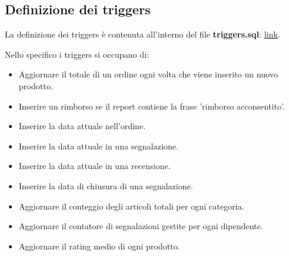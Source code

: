 \subsection{Definizione dei triggers}

La definizione dei triggers è contenuta all'interno del file \textbf{triggers.sql}: \href{https://github.com/krosspile/ecommerce_database/blob/master/src/database/triggers.sql}{link}.

Nello specifico i triggers si occupano di:\\
\begin{itemize}
    \item Aggiornare il totale di un ordine ogni volta che viene inserito un nuovo prodotto.
    \item Inserire un rimborso se il report contiene la frase 'rimborso acconsentito'.
    \item Inserire la data attuale nell'ordine.
    \item Inserire la data attuale in una segnalazione.
    \item Inserire la data attuale in una recensione.
    \item Inserire la data di chiusura di una segnalazione.
    \item Aggiornare il conteggio degli articoli totali per ogni categoria.
    \item Aggiornare il contatore di segnalazioni gestite per ogni dipendente.
    \item Aggiornare il rating medio di ogni prodotto.
\end{itemize}